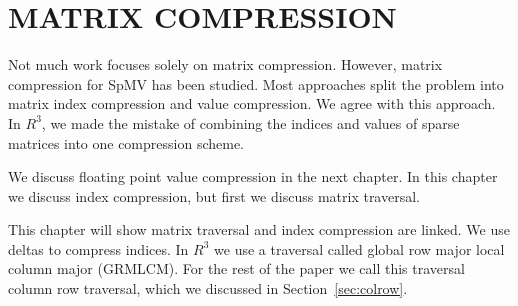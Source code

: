 \chapter{MATRIX COMPRESSION}
\label{chp:compression}
Not much work focuses solely on matrix compression. However, matrix compression for SpMV has been studied. Most approaches split the problem into matrix index compression and value compression. We agree with this approach. In $R^3$, we made the mistake of combining the indices and values of sparse matrices into one compression scheme. 
\par We discuss floating point value compression in the next chapter. In this chapter we discuss index compression, but first we discuss matrix traversal. \par
This chapter will show matrix traversal and index compression are linked. We use deltas to compress indices. In $R^3$ we use a traversal called global row major local column major (GRMLCM). For the rest of the paper we call this traversal column row traversal, which we discussed in Section~\ref{sec:colrow}. \par
